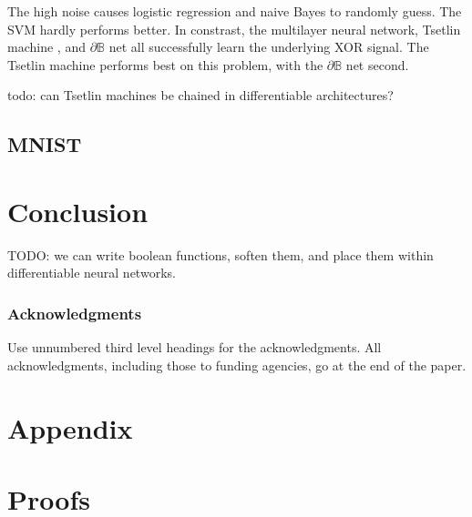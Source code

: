 \documentclass{article} %
\begin{document}
The high noise causes logistic regression and naive Bayes to randomly guess. The SVM hardly performs better. In constrast, the multilayer neural network, Tsetlin machine \citep{granmo18}, and  $\partial\mathbb{B}$ net all successfully learn the underlying XOR signal. The Tsetlin machine performs best on this problem, with the $\partial\mathbb{B}$ net second.

todo: can Tsetlin machines be chained in differentiable architectures?

\subsection{MNIST}

\section{Conclusion}

TODO: we can write boolean functions, soften them, and place them within differentiable neural networks.

\subsubsection*{Acknowledgments}
Use unnumbered third level headings for the acknowledgments. All
acknowledgments, including those to funding agencies, go at the end of the paper.





\appendix

\section*{Appendix}

\section{Proofs}
\end{document}
